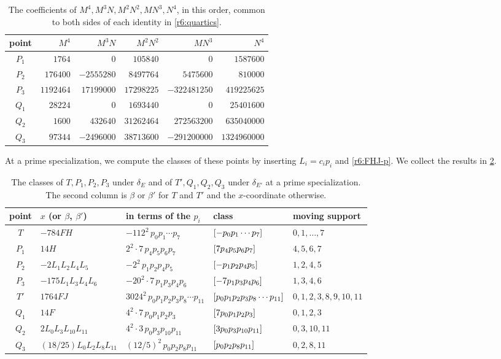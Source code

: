 \begin{table}[htbp]
\centering
\caption{The coefficients of $M^4,M^3N,M^2N^2,MN^3,N^4$, in this order, common to both sides of each identity in \eqref{r6:quartics}.}
\label{tab:r6-quartics}
\begin{tabular}{crrrrr}
\toprule
point & $M^4$ & $M^3N$ & $M^2N^2$ & $MN^3$ & $N^4$\\
\midrule
$P_1$ & $1764$ & $0$ & $105840$ & $0$ & $1587600$\\
$P_2$ & $176400$ & $-2555280$ & $8497764$ & $5475600$ & $810000$\\
$P_3$ & $1192464$ & $17199000$ & $17298225$ & $-322481250$ & $419225625$\\
$Q_1$ & $28224$ & $0$ & $1693440$ & $0$ & $25401600$\\
$Q_2$ & $1600$ & $432640$ & $31262464$ & $272563200$ & $635040000$\\
$Q_3$ & $97344$ & $-2496000$ & $38713600$ & $-291200000$ & $1324960000$\\
\bottomrule
\end{tabular}
\end{table}

At a prime specialization, we compute the classes of these points by inserting $L_i=c_ip_i$ and \eqref{r6:FHJ-p}. We collect the results in \cref{tab:r6-classes}.

\begin{table}[htbp]
\centering
\caption{The classes of $T,P_1,P_2,P_3$ under $\delta_E$ and of $T',Q_1,Q_2,Q_3$ under $\delta_{E'}$ at a prime specialization. The second column is $\beta$ or $\beta'$ for $T$ and $T'$ and the $x$-coordinate otherwise.}
\label{tab:r6-classes}
\small
\setlength{\tabcolsep}{4pt}
\begin{tabular}{cllll}
\toprule
point & $x$ (or $\beta$, $\beta'$) & in terms of the $p_i$ & class & moving support\\
\midrule
$T$ & $-784FH$ & $-112^2\,p_0p_1\cdots p_7$ & $[-p_0p_1\cdots p_7]$ & $0,1,\dots,7$\\
$P_1$ & $14H$ & $2^2\cdot7\,p_4p_5p_6p_7$ & $[7p_4p_5p_6p_7]$ & $4,5,6,7$\\
$P_2$ & $-2L_1L_2L_4L_5$ & $-2^2\,p_1p_2p_4p_5$ & $[-p_1p_2p_4p_5]$ & $1,2,4,5$\\
$P_3$ & $-175L_1L_3L_4L_6$ & $-20^2\cdot7\,p_1p_3p_4p_6$ & $[-7p_1p_3p_4p_6]$ & $1,3,4,6$\\
\midrule
$T'$ & $1764FJ$ & $3024^2\,p_0p_1p_2p_3p_8\cdots p_{11}$ & $[p_0p_1p_2p_3p_8\cdots p_{11}]$ & $0,1,2,3,8,9,10,11$\\
$Q_1$ & $14F$ & $4^2\cdot7\,p_0p_1p_2p_3$ & $[7p_0p_1p_2p_3]$ & $0,1,2,3$\\
$Q_2$ & $2L_0L_3L_{10}L_{11}$ & $4^2\cdot3\,p_0p_3p_{10}p_{11}$ & $[3p_0p_3p_{10}p_{11}]$ & $0,3,10,11$\\
$Q_3$ & $(18/25)L_0L_2L_8L_{11}$ & $(12/5)^2\,p_0p_2p_8p_{11}$ & $[p_0p_2p_8p_{11}]$ & $0,2,8,11$\\
\bottomrule
\end{tabular}
\end{table}

